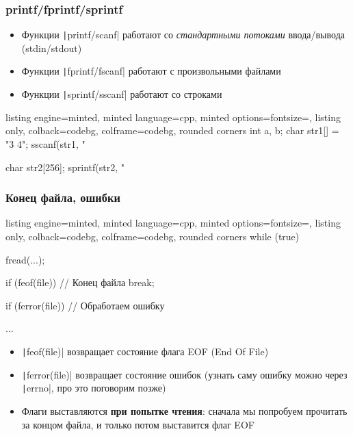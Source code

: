 \documentclass[10pt]{beamer}
\begin{document}
\begin{frame}[fragile]
\frametitle{printf/fprintf/sprintf}
\begin{itemize}
\item Функции \texttt|printf/scanf| работают со \textit{стандартными потоками} ввода/вывода (stdin/stdout)
\pause
\item Функции \texttt|fprintf/fscanf| работают с произвольными файлами
\pause
\item Функции \texttt|sprintf/sscanf| работают со строками
\end{itemize}
\pause
{}
\begin{tcblisting}{listing engine=minted, minted language=cpp, minted options={fontsize=\scriptsize}, listing only, colback=codebg, colframe=codebg, rounded corners}
int a, b;
char str1[] = "3 4";
sscanf(str1, "%

char str2[256];
sprintf(str2, "%
\end{tcblisting}
\end{frame}

\begin{frame}[fragile]
\frametitle{Конец файла, ошибки}
\begin{tcblisting}{listing engine=minted, minted language=cpp, minted options={fontsize=\scriptsize}, listing only, colback=codebg, colframe=codebg, rounded corners}
while (true) {
  fread(...);

  if (feof(file)) {
    // Конец файла
    break;
  }

  if (ferror(file)) {
    // Обработаем ошибку
  }

  ...
}
\end{tcblisting}
\pause
{}
\begin{itemize}
\item \texttt|feof(file)| возвращает состояние флага EOF (End Of File)
\pause
\item \texttt|ferror(file)| возвращает состояние ошибок (узнать саму ошибку можно через \texttt|errno|, про это поговорим позже)
\pause
\item Флаги выставляются \textbf{при попытке чтения}: сначала мы попробуем прочитать за концом файла, и только потом выставится флаг EOF
\end{itemize}
\end{frame}
\end{document}
